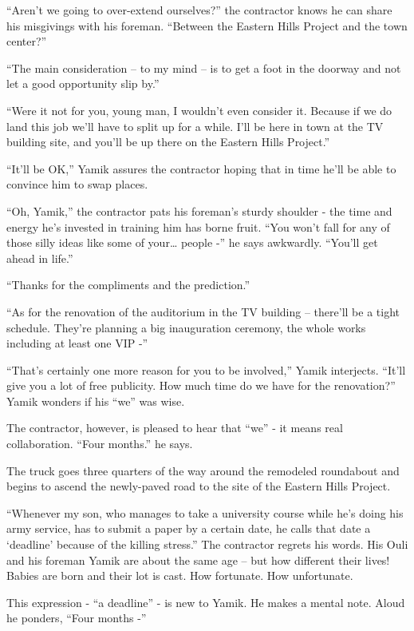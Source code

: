 \documentclass[twoside,11pt]{book}
\begin{document}
``Aren't we going to over-extend ourselves?'' the contractor knows he can share his misgivings
with his foreman. ``Between the Eastern Hills Project and the town center?''

``The main consideration -- to my mind -- is to get a foot in the doorway and not let a good opportunity
slip by.''

``Were it not for you, young man, I wouldn't even consider it. Because if we do land this job we'll have to
split up for a while. I'll be here in town at the TV building site, and you'll be up there on the Eastern Hills
Project.''

``It'll be OK,'' Yamik assures the contractor hoping that in time he'll be able to convince
him to swap places.

``Oh, Yamik,'' the contractor pats his foreman's sturdy shoulder - the time and energy he's
invested in training him has borne fruit. ``You won't fall for any of those silly ideas like some of
your{\dots} people -'' he says awkwardly. ``You'll get ahead in life.''

``Thanks for the compliments and the prediction.''

``As for the renovation of the auditorium in the TV building -- there'll be a tight schedule. They're
planning a big inauguration ceremony, the whole works including at least one VIP -''

``That's certainly one more reason for you to be involved,'' Yamik interjects.
``It'll give you a lot of free publicity. How much time do we have for the renovation?''
Yamik wonders if his ``we'' was wise.

The contractor, however, is pleased to hear that ``we'' - it means real collaboration. ``Four
months.'' he says.

The truck goes three quarters of the way around the remodeled roundabout and begins to ascend the newly-paved road to
the site of the Eastern Hills Project.

``Whenever my son, who manages to take a university course while he's doing his army
service, has to submit a paper by a certain date, he calls that date a `deadline' because of the killing
stress.'' The contractor regrets his words. His Ouli and his foreman Yamik are about the same age -- but
how different their lives! Babies are born and their lot is cast. How fortunate. How unfortunate.

This expression - ``a deadline'' - is new to Yamik. He makes a mental note. Aloud he ponders,
``Four months -''
\end{document}
